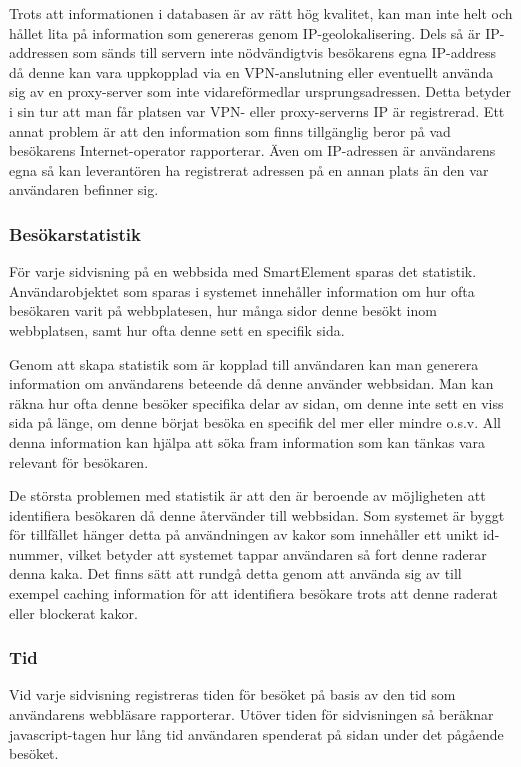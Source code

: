 Trots att informationen i databasen är av rätt hög kvalitet, kan man inte helt och hållet lita på information som genereras genom IP-geolokalisering. Dels så är IP-addressen som sänds till servern inte nödvändigtvis besökarens egna IP-address då denne kan vara uppkopplad via en VPN-anslutning eller eventuellt använda sig av en proxy-server som inte vidareförmedlar ursprungsadressen. Detta betyder i sin tur att man får platsen var VPN- eller proxy-serverns IP är registrerad. Ett annat problem är att den information som finns tillgänglig beror på vad besökarens Internet-operator rapporterar. Även om IP-adressen är användarens egna så kan leverantören ha registrerat adressen på en annan plats än den var användaren befinner sig. 

\subsubsection{Besökarstatistik}

För varje sidvisning på en webbsida med SmartElement sparas det statistik. Användarobjektet som sparas i systemet innehåller information om hur ofta besökaren varit på webbplatesen, hur många sidor denne besökt inom webbplatsen, samt hur ofta denne sett en specifik sida.

Genom att skapa statistik som är kopplad till användaren kan man generera information om användarens beteende då denne använder webbsidan. Man kan räkna hur ofta denne besöker specifika delar av sidan, om denne inte sett en viss sida på länge, om denne börjat besöka en specifik del mer eller mindre o.s.v. All denna information kan hjälpa att söka fram information som kan tänkas vara relevant för besökaren.

De största problemen med statistik är att den är beroende av möjligheten att identifiera besökaren då denne återvänder till webbsidan. Som systemet är byggt för tillfället hänger detta på användningen av kakor som innehåller ett unikt id-nummer, vilket betyder att systemet tappar användaren så fort denne raderar denna kaka. Det finns sätt att rundgå detta genom att använda sig av till exempel caching information för att identifiera besökare trots att denne raderat eller blockerat kakor. \citep{ashkanblog}



\subsubsection{Tid}

Vid varje sidvisning registreras tiden för besöket på basis av den tid som användarens webbläsare rapporterar. Utöver tiden för sidvisningen så beräknar javascript-tagen hur lång tid användaren spenderat på sidan under det pågående besöket.

